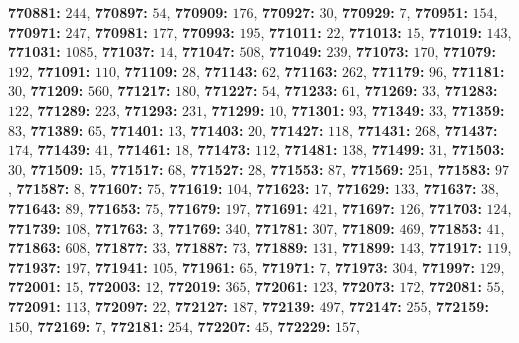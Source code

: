\textsf{\bfseries 770881:} $244$, \textsf{\bfseries 770897:} $54$, \textsf{\bfseries 770909:} $176$, \textsf{\bfseries 770927:} $30$, \textsf{\bfseries 770929:} $7$, \textsf{\bfseries 770951:} $154$, \textsf{\bfseries 770971:} $247$, \textsf{\bfseries 770981:} $177$, \textsf{\bfseries 770993:} $195$, \textsf{\bfseries 771011:} $22$, \textsf{\bfseries 771013:} $15$, \textsf{\bfseries 771019:} $143$, \textsf{\bfseries 771031:} $1085$, \textsf{\bfseries 771037:} $14$, \textsf{\bfseries 771047:} $508$, \textsf{\bfseries 771049:} $239$, \textsf{\bfseries 771073:} $170$, \textsf{\bfseries 771079:} $192$, \textsf{\bfseries 771091:} $110$, \textsf{\bfseries 771109:} $28$, \textsf{\bfseries 771143:} $62$, \textsf{\bfseries 771163:} $262$, \textsf{\bfseries 771179:} $96$, \textsf{\bfseries 771181:} $30$, \textsf{\bfseries 771209:} $560$, \textsf{\bfseries 771217:} $180$, \textsf{\bfseries 771227:} $54$, \textsf{\bfseries 771233:} $61$, \textsf{\bfseries 771269:} $33$, \textsf{\bfseries 771283:} $122$, \textsf{\bfseries 771289:} $223$, \textsf{\bfseries 771293:} $231$, \textsf{\bfseries 771299:} $10$, \textsf{\bfseries 771301:} $93$, \textsf{\bfseries 771349:} $33$, \textsf{\bfseries 771359:} $83$, \textsf{\bfseries 771389:} $65$, \textsf{\bfseries 771401:} $13$, \textsf{\bfseries 771403:} $20$, \textsf{\bfseries 771427:} $118$, \textsf{\bfseries 771431:} $268$, \textsf{\bfseries 771437:} $174$, \textsf{\bfseries 771439:} $41$, \textsf{\bfseries 771461:} $18$, \textsf{\bfseries 771473:} $112$, \textsf{\bfseries 771481:} $138$, \textsf{\bfseries 771499:} $31$, \textsf{\bfseries 771503:} $30$, \textsf{\bfseries 771509:} $15$, \textsf{\bfseries 771517:} $68$, \textsf{\bfseries 771527:} $28$, \textsf{\bfseries 771553:} $87$, \textsf{\bfseries 771569:} $251$, \textsf{\bfseries 771583:} $97$, \textsf{\bfseries 771587:} $8$, \textsf{\bfseries 771607:} $75$, \textsf{\bfseries 771619:} $104$, \textsf{\bfseries 771623:} $17$, \textsf{\bfseries 771629:} $133$, \textsf{\bfseries 771637:} $38$, \textsf{\bfseries 771643:} $89$, \textsf{\bfseries 771653:} $75$, \textsf{\bfseries 771679:} $197$, \textsf{\bfseries 771691:} $421$, \textsf{\bfseries 771697:} $126$, \textsf{\bfseries 771703:} $124$, \textsf{\bfseries 771739:} $108$, \textsf{\bfseries 771763:} $3$, \textsf{\bfseries 771769:} $340$, \textsf{\bfseries 771781:} $307$, \textsf{\bfseries 771809:} $469$, \textsf{\bfseries 771853:} $41$, \textsf{\bfseries 771863:} $608$, \textsf{\bfseries 771877:} $33$, \textsf{\bfseries 771887:} $73$, \textsf{\bfseries 771889:} $131$, \textsf{\bfseries 771899:} $143$, \textsf{\bfseries 771917:} $119$, \textsf{\bfseries 771937:} $197$, \textsf{\bfseries 771941:} $105$, \textsf{\bfseries 771961:} $65$, \textsf{\bfseries 771971:} $7$, \textsf{\bfseries 771973:} $304$, \textsf{\bfseries 771997:} $129$, \textsf{\bfseries 772001:} $15$, \textsf{\bfseries 772003:} $12$, \textsf{\bfseries 772019:} $365$, \textsf{\bfseries 772061:} $123$, \textsf{\bfseries 772073:} $172$, \textsf{\bfseries 772081:} $55$, \textsf{\bfseries 772091:} $113$, \textsf{\bfseries 772097:} $22$, \textsf{\bfseries 772127:} $187$, \textsf{\bfseries 772139:} $497$, \textsf{\bfseries 772147:} $255$, \textsf{\bfseries 772159:} $150$, \textsf{\bfseries 772169:} $7$, \textsf{\bfseries 772181:} $254$, \textsf{\bfseries 772207:} $45$, \textsf{\bfseries 772229:} $157$, 
